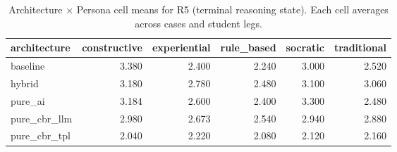 \begin{table}[htbp]
\centering
\caption{Architecture $\times$ Persona cell means for R5 (terminal reasoning state). Each cell averages across cases and student legs.}
\label{tab:cell-R5}
\begin{tabular}{lrrrrr}
\toprule
architecture & constructive & experiential & rule\_based & socratic & traditional \\
\midrule
baseline & 3.380 & 2.400 & 2.240 & 3.000 & 2.520 \\
hybrid & 3.180 & 2.780 & 2.480 & 3.100 & 3.060 \\
pure\_ai & 3.184 & 2.600 & 2.400 & 3.300 & 2.480 \\
pure\_cbr\_llm & 2.980 & 2.673 & 2.540 & 2.940 & 2.880 \\
pure\_cbr\_tpl & 2.040 & 2.220 & 2.080 & 2.120 & 2.160 \\
\bottomrule
\end{tabular}
\end{table}
